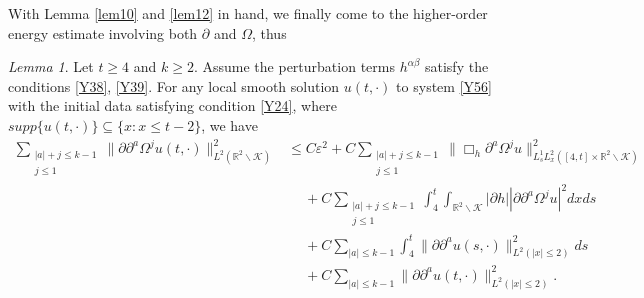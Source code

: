 \documentclass[11pt, reqno]{amsart}
\theoremstyle{definition}
\theoremstyle{remark}
\newtheorem{lem}[thm]{Lemma}
\theoremstyle{definition}
\numberwithin{equation}{section}
\numberwithin{equation}{section}
\def\leq{\leqslant}
\def\geq{\geqslant}
\begin{document}
With Lemma \ref{lem10} and \ref{lem12} in hand, we finally come to the higher-order energy estimate involving both $\partial$ and $\Omega$, thus
\begin{lem}\label{lem9}
Let $t\geq4$ and $k\geq2$.  Assume the perturbation terms
$h^{\alpha\beta}$ satisfy the conditions \eqref{Y38}, \eqref{Y39}.
For any local smooth solution $u(t,\cdot)$ to system \eqref{Y56}
with the initial data satisfying condition \eqref{Y24}, where
$supp\{u(t,\cdot)\}\subseteq\{x:x\leq t-2\}$, we have
\begin{align*}
\sum_{\substack{|a|+j\leq
k-1\\j\leq1}}\|\partial\partial^a\Omega^ju(t,\cdot)\|^2_{L^2(\mathbb
R^2\backslash\mathcal {K})}&\leq
C\varepsilon^2+C\sum_{\substack{|a|+j\leq k-1\\j\leq1}}\|\Box_h
\partial^a\Omega^ju\|^2_{L^1_sL^2_x([4,t]\times\mathbb R^2\backslash\mathcal {K})}
\nonumber\\&\quad\ +C\sum_{\substack{|a|+j\leq
k-1\\j\leq1}}\int_4^t\int_{\mathbb R^2\backslash\mathcal
{K}}|\partial h||\partial\partial^a\Omega^ju|^2dxds
\nonumber\\&\quad\ +C\sum_{|a|\leq
k-1}\int_4^t\|\partial\partial^au(s,\cdot)\|^2_{L^2(|x|\leq2)}ds
\nonumber\\&\quad\ +C\sum_{|a|\leq
k-1}\|\partial\partial^au(t,\cdot)\|^2_{L^2(|x|\leq2)}.
\end{align*}
\end{lem}
\end{document}
